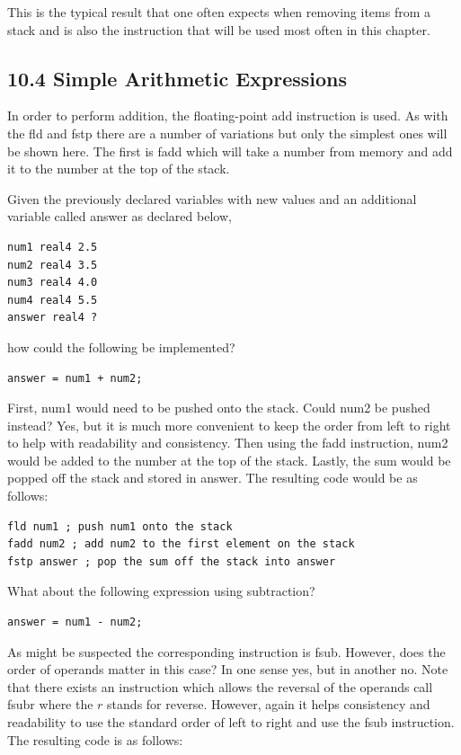 \documentclass[10pt]{article}
\begin{document}
This is the typical result that one often expects when removing items from a stack and is also the instruction that will be used most often in this chapter.

\subsection*{10.4 Simple Arithmetic Expressions}
In order to perform addition, the floating-point add instruction is used. As with the fld and fstp there are a number of variations but only the simplest ones will be shown here. The first is fadd which will take a number from memory and add it to the number at the top of the stack.

Given the previously declared variables with new values and an additional variable called answer as declared below,

\begin{verbatim}
num1 real4 2.5
num2 real4 3.5
num3 real4 4.0
num4 real4 5.5
answer real4 ?
\end{verbatim}

how could the following be implemented?

\begin{verbatim}
answer = num1 + num2;
\end{verbatim}

First, num1 would need to be pushed onto the stack. Could num2 be pushed instead? Yes, but it is much more convenient to keep the order from left to right to help with readability and consistency. Then using the fadd instruction, num2 would be added to the number at the top of the stack. Lastly, the sum would be popped off the stack and stored in answer. The resulting code would be as follows:

\begin{verbatim}
fld num1 ; push num1 onto the stack
fadd num2 ; add num2 to the first element on the stack
fstp answer ; pop the sum off the stack into answer
\end{verbatim}

What about the following expression using subtraction?

\begin{verbatim}
answer = num1 - num2;
\end{verbatim}

As might be suspected the corresponding instruction is fsub. However, does the order of operands matter in this case? In one sense yes, but in another no. Note that there exists an instruction which allows the reversal of the operands call fsubr where the $r$ stands for reverse. However, again it helps consistency and readability to use the standard order of left to right and use the fsub instruction. The resulting code is as follows:
\end{document}
